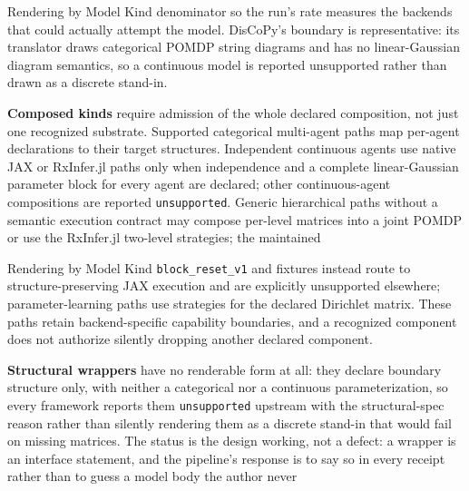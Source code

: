 \documentclass[
  ignorenonframetext,
]{beamer}
\begin{document}
\begin{frame}{Rendering by Model Kind}
denominator so the run's rate measures the backends that could actually
attempt the model. DisCoPy's boundary is representative: its translator
draws categorical POMDP string diagrams and has no linear-Gaussian
diagram semantics, so a continuous model is reported unsupported rather
than drawn as a discrete stand-in.

\textbf{Composed kinds} require admission of the whole declared
composition, not just one recognized substrate. Supported categorical
multi-agent paths map per-agent declarations to their target structures.
Independent continuous agents use native JAX or RxInfer.jl paths only
when independence and a complete linear-Gaussian parameter block for
every agent are declared; other continuous-agent compositions are
reported \texttt{unsupported}. Generic hierarchical paths without a
semantic execution contract may compose per-level matrices into a joint
POMDP or use the RxInfer.jl two-level strategies; the maintained
\end{frame}

\begin{frame}{Rendering by Model Kind}
\texttt{block\_reset\_v1} and 
fixtures instead route to structure-preserving JAX execution and are
explicitly unsupported elsewhere; parameter-learning paths use
strategies for the declared Dirichlet matrix. These paths retain
backend-specific capability boundaries, and a recognized component does
not authorize silently dropping another declared component.

\textbf{Structural wrappers} have no renderable form at all: they
declare boundary structure only, with neither a categorical nor a
continuous parameterization, so every framework reports them
\texttt{unsupported} upstream with the structural-spec reason rather
than silently rendering them as a discrete stand-in that would fail on
missing matrices. The status is the design working, not a defect: a
wrapper is an interface statement, and the pipeline's response is to say
so in every receipt rather than to guess a model body the author never
\end{frame}
\end{document}
